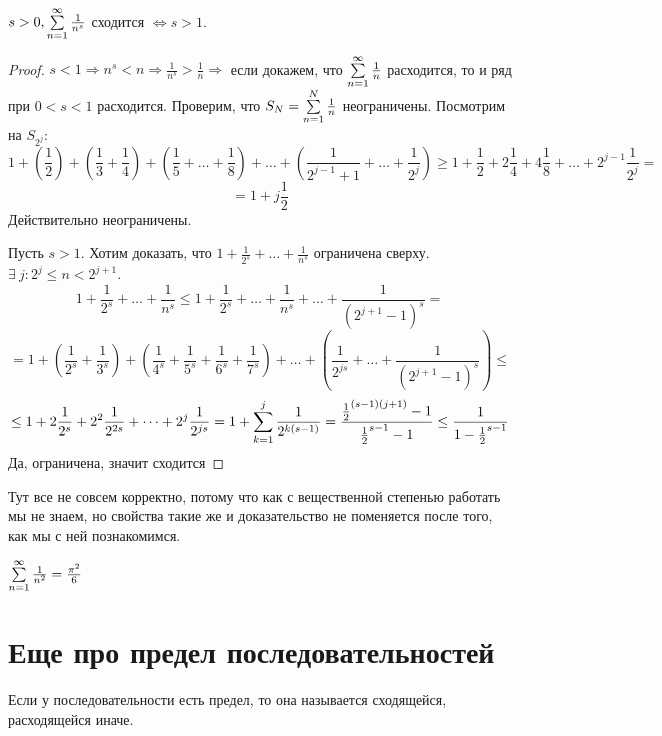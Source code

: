 \documentclass[12pt]{report}
\begin{document}
\begin{st}
$s > 0, \sum\limits_{n = 1}^\infty{\frac{1}{n^s}}$ сходится $\Leftrightarrow s > 1$.
\end{st}
\begin{proof}
$s < 1 \Rightarrow n^s < n \Rightarrow \frac{1}{n^s} > \frac{1}{n} \Rightarrow$ если докажем, что $\sum\limits_{n = 1}^\infty{\frac{1}{n}}$ расходится, то и ряд при $0 < s < 1$ расходится. Проверим, что $S_N = \sum\limits_{n = 1}^N{\frac{1}{n}}$ неограничены. Посмотрим на $S_{2^j}$:
$$1 + (\frac{1}{2}) + (\frac{1}{3} + \frac{1}{4}) + (\frac{1}{5} + \dots + \frac{1}{8}) + \dots + (\frac{1}{2^{j - 1} + 1} + \dots + \frac{1}{2^j}) \ge 1 + \frac{1}{2} + 2\frac{1}{4} + 4\frac{1}{8} + \dots + 2^{j - 1}\frac{1}{2^j} = $$
$$ = 1 + j\frac{1}{2}$$
Действительно неограничены. 

Пусть $s > 1$. Хотим доказать, что $1 + \frac{1}{2^s} + \dots + \frac{1}{n^s}$ ограничена сверху. $\exists ~j: 2^j \le n < 2^{j + 1}$.
$$1 + \frac{1}{2^s} + \dots + \frac{1}{n^s} \le 1 + \frac{1}{2^s} + \dots + \frac{1}{n^s} + \dots + \frac{1}{(2^{j + 1} - 1)^s} = $$ 
$$ = 1 + (\frac{1}{2^s} + \frac{1}{3^s}) + (\frac{1}{4^s} + \frac{1}{5^s} + \frac{1}{6^s} + \frac{1}{7^s}) + \dots + (\frac{1}{2^{js}} + \dots + \frac{1}{(2^{j + 1} - 1)^s}) \le$$
$$\le 1 + 2\frac{1}{2^s} + 2^2\frac{1}{2^{2s}} + \dots + 2^j\frac{1}{2^{js}} = 1 + \sum\limits_{k = 1}^j{\frac{1}{2^{k(s - 1)}}} = \frac{\frac{1}{2}^{(s - 1)(j + 1)} - 1}{\frac{1}{2}^{s - 1} - 1} \le \frac{1}{1 - \frac{1}{2}^{s - 1}}$$
Да, ограничена, значит сходится
\end{proof}

\begin{note}
Тут все не совсем корректно, потому что как с вещественной степенью работать мы не знаем, но свойства такие же и доказательство не поменяется после того, как мы с ней познакомимся.
\end{note}

\begin{ex}
$\sum\limits_{n = 1}^\infty{\frac{1}{n^2}} = \frac{\pi^2}{6}$
\end{ex}

\section{Еще про предел последовательностей}

\begin{defn}
Если у последовательности есть предел, то она называется сходящейся, расходящейся иначе. 
\end{defn}
\end{document}

